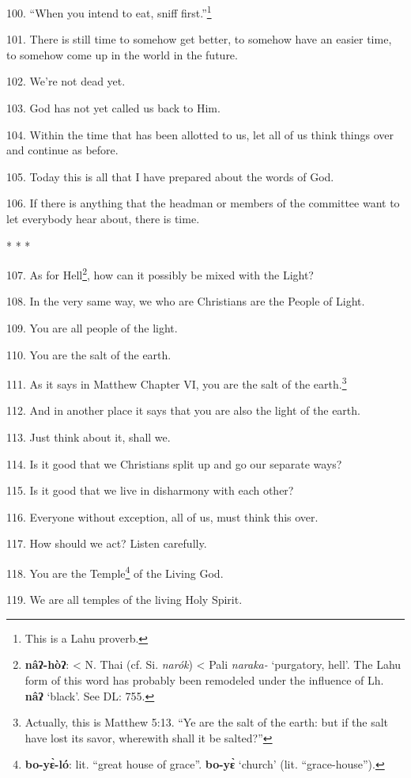 100. ``When you intend to eat, sniff first.''\footnote{This is a Lahu proverb.}

101. There is still time to somehow get better, to somehow have an easier time,
to somehow come up in the world in the future.

102. We're not dead yet.

103. God has not yet called us back to Him.

104. Within the time that has been allotted to us, let all of us think things over
and continue as before.

105. Today this is all that I have prepared about the words of God.

106. If there is anything that the headman or members of the committee want to
let everybody hear about, there is time.

* * *

107. As for Hell\footnote{\textbf{nâʔ-hòʔ}: < N. Thai (cf. Si. \textit{narók}) < Pali \textit{naraka-} `purgatory, hell'. The Lahu form of this word has probably been remodeled under the influence of Lh. \textbf{nâʔ} `black'. See DL: 755.}, how can it possibly be mixed with the Light?

108. In the very same way, we who are Christians are the People of Light.

109. You are all people of the light.

110. You are the salt of the earth.

111. As it says in Matthew Chapter VI, you are the salt of the earth.\footnote{Actually, this is Matthew 5:13. ``Ye are the salt of the earth: but if the salt have lost its savor, wherewith shall it be salted?''}

112. And in another place it says that you are also the light of the earth.

113. Just think about it, shall we.

114. Is it good that we Christians split up and go our separate ways?

115. Is it good that we live in disharmony with each other?

116. Everyone without exception, all of us, must think this over.

117. How should we act? Listen carefully.

118. You are the Temple\footnote{\textbf{bo-yɛ̀-ló}: lit. ``great house of grace''. \textbf{bo-yɛ̀} `church' (lit. ``grace-house'').} of the Living God.

119. We are all temples of the living Holy Spirit.

